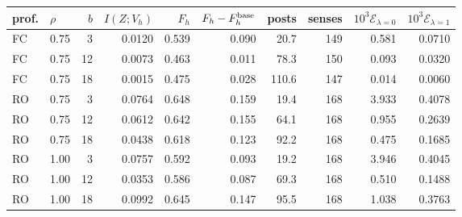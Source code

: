 \begin{tabular}{llr rrr rr rr}
\toprule
prof. & $\rho$ & $b$ & $I(Z;V_h)$ & $F_h$ & $F_h-F^{\rm base}_h$ & posts & senses & $10^3 \mathcal E_{\lambda=0}$ & $10^3\mathcal E_{\lambda=1}$ \\
\midrule
FC & 0.75 & 3 & 0.0120 & 0.539 & 0.090 & 20.7 & 149 & 0.581 & 0.0710 \\
FC & 0.75 & 12 & 0.0073 & 0.463 & 0.011 & 78.3 & 150 & 0.093 & 0.0320 \\
FC & 0.75 & 18 & 0.0015 & 0.475 & 0.028 & 110.6 & 147 & 0.014 & 0.0060 \\
RO & 0.75 & 3 & 0.0764 & 0.648 & 0.159 & 19.4 & 168 & 3.933 & 0.4078 \\
RO & 0.75 & 12 & 0.0612 & 0.642 & 0.155 & 64.1 & 168 & 0.955 & 0.2639 \\
RO & 0.75 & 18 & 0.0438 & 0.618 & 0.123 & 92.2 & 168 & 0.475 & 0.1685 \\
RO & 1.00 & 3 & 0.0757 & 0.592 & 0.093 & 19.2 & 168 & 3.946 & 0.4045 \\
RO & 1.00 & 12 & 0.0353 & 0.586 & 0.087 & 69.3 & 168 & 0.510 & 0.1488 \\
RO & 1.00 & 18 & 0.0992 & 0.645 & 0.147 & 95.5 & 168 & 1.038 & 0.3763 \\
\bottomrule
\end{tabular}
